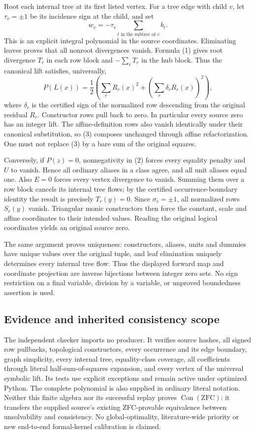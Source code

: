 Root each internal tree at its first listed vertex. For a tree edge with
child $v$, let $\tau_v=\pm1$ be its incidence sign at the child, and set
\[
 w_v=-\tau_v\sum_{t\text{ in the subtree of }v}b_t.
\]
This is an explicit integral polynomial in the source coordinates.
Eliminating leaves proves that all nonroot divergences vanish. Formula
(1) gives root divergence $T_r$ in each row block and $-\sum_rT_r$ in the
hub block. Thus the canonical lift satisfies, universally,
\[
 P(L(x))=\frac12\left(\sum_rR_r(x)^2+
                \left(\sum_r\delta_rR_r(x)\right)^2\right),       \tag{3}
\]
where $\delta_r$ is the certified sign of the normalized row descending
from the original residual $R_r$. Constructor rows pull back to zero.
In particular every source zero has an integer lift. The affine-definition
rows also vanish identically under their canonical substitution, so (3)
composes unchanged through affine refactorization. One must not replace
(3) by a bare sum of the original squares.

Conversely, if $P(z)=0$, nonnegativity in (2) forces every equality
penalty and $U$ to vanish. Hence all ordinary aliases in a class agree,
and all unit aliases equal one. Also $E=0$ forces every vertex divergence
to vanish. Summing them over a row block cancels its internal tree flows;
by the certified occurrence-boundary identity the result is precisely
$T_r(y)=0$. Since $\sigma_r=\pm1$, all normalized rows $S_r(y)$ vanish.
Triangular monic constructors then force the constant, scale and affine
coordinates to their intended values. Reading the original logical
coordinates yields an original source zero.

The same argument proves uniqueness: constructors, aliases, units and
dummies have unique values over the original tuple, and leaf elimination
uniquely determines every internal tree flow. Thus the displayed forward
map and coordinate projection are inverse bijections between integer zero
sets. No sign restriction on a final variable, division by a variable,
or unproved boundedness assertion is used.

\subsection{Evidence and inherited consistency scope}
The independent checker imports no producer. It verifies source hashes,
all signed row pullbacks, topological constructors, every occurrence and
its edge boundary, graph simplicity, every internal tree, equality-class
coverage, all coefficients through literal half-sum-of-squares expansion,
and every vertex of the universal symbolic lift. Its tests use explicit
exceptions and remain active under optimized Python. The complete
polynomial is also supplied in ordinary literal notation. Neither this
finite algebra nor its successful replay proves $\operatorname{Con}(\mathrm{ZFC})$:
it transfers the supplied source's existing ZFC-provable equivalence
between unsolvability and consistency. No global-optimality, literature-wide
priority or new end-to-end formal-kernel calibration is claimed.
